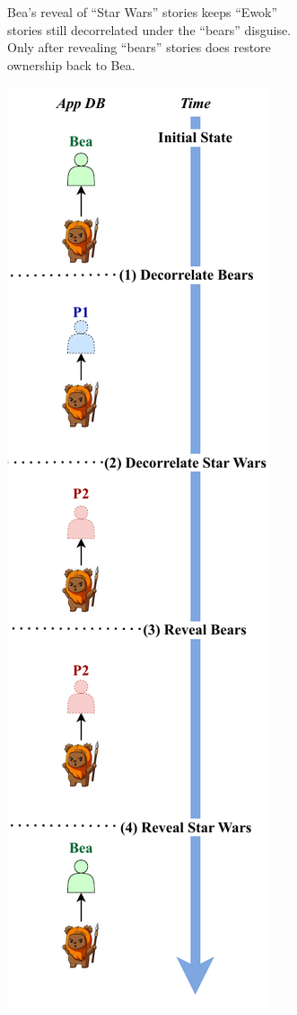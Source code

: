 \begin{figure}
\begin{subfigure}[t]{.47\columnwidth}
  \caption{Bea's reveal of ``Star Wars'' stories keeps ``Ewok'' stories still
        decorrelated under the ``bears'' disguise. Only after revealing
        ``bears'' stories does \sys restore ownership back to Bea.}
    \label{f:composition-hl-inorder}
    \end{subfigure}
    \hfill
\begin{subfigure}[t]{.47\columnwidth}
    \centering
    \includegraphics[width=.75\textwidth]{figs/composition-hl-ooo}

\end{subfigure}
\end{figure}
